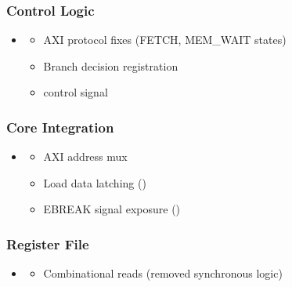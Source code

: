 \subsubsection{Control Logic}\label{cr:fix:fixes-index:control-logic}

\begin{record}

\begin{itemize}
\tightlist
\item

  \begin{itemize}
  \tightlist
  \item
    AXI protocol fixes (FETCH, MEM\_WAIT states)
  \item
    Branch decision registration
  \item
     control signal
  \end{itemize}
\end{itemize}

\end{record}

\subsubsection{Core Integration}\label{cr:fix:fixes-index:core-integration}

\begin{record}

\begin{itemize}
\tightlist
\item

  \begin{itemize}
  \tightlist
  \item
    AXI address mux
  \item
    Load data latching ()
  \item
    EBREAK signal exposure ()
  \end{itemize}
\end{itemize}

\end{record}

\subsubsection{Register File}\label{cr:fix:fixes-index:register-file}

\begin{record}

\begin{itemize}
\tightlist
\item

  \begin{itemize}
  \tightlist
  \item
    Combinational reads (removed synchronous logic)
  \end{itemize}
\end{itemize}

\end{record}

